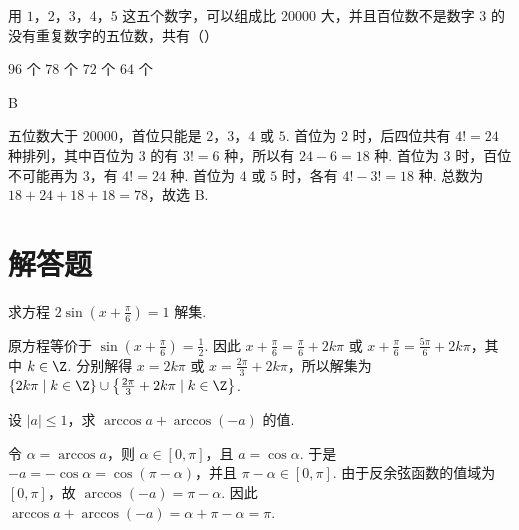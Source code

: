 \documentclass[UTF8,a4paper,oneside,11pt]{ctexbook}
\begin{document}
\begin{problem}

用 \(1\)，\(2\)，\(3\)，\(4\)，\(5\) 这五个数字，可以组成比 \(20000\) 大，并且百位数不是数字 \(3\) 的没有重复数字的五位数，共有（\quad）

\choices
    {\(96\text{ 个}\)}
    {\(78\text{ 个}\)}
    {\(72\text{ 个}\)}
    {\(64\text{ 个}\)}

\begin{answer}
B
\end{answer}

\begin{solution}
五位数大于 \(20000\)，首位只能是 \(2\)，\(3\)，\(4\) 或 \(5\). 首位为 \(2\) 时，后四位共有 \(4!=24\) 种排列，其中百位为 \(3\) 的有 \(3!=6\) 种，所以有 \(24-6=18\) 种. 首位为 \(3\) 时，百位不可能再为 \(3\)，有 \(4!=24\) 种. 首位为 \(4\) 或 \(5\) 时，各有 \(4!-3!=18\) 种. 总数为 \(18+24+18+18=78\)，故选 B.
\end{solution}
\end{problem}

\section{解答题}

\begin{problem}

求方程 \(2\sin \left(x + \frac{\pi}{6}\right) = 1\) 解集.

\begin{solution}
原方程等价于 \(\sin\left(x+\frac{\pi}{6}\right)=\frac{1}{2}\). 因此 \(x+\frac{\pi}{6}=\frac{\pi}{6}+2k\pi\) 或 \(x+\frac{\pi}{6}=\frac{5\pi}{6}+2k\pi\)，其中 \(k\in\Z\). 分别解得 \(x=2k\pi\) 或 \(x=\frac{2\pi}{3}+2k\pi\)，所以解集为 \(\left\{2k\pi\mid k\in\Z\right\}\cup\left\{\frac{2\pi}{3}+2k\pi\mid k\in\Z\right\}\).
\end{solution}
\end{problem}

\begin{problem}

设 \(|a|\leqslant 1\)，求 \(\arccos a+\arccos\left(-a\right)\) 的值.

\begin{solution}
令 \(\alpha=\arccos a\)，则 \(\alpha\in[0,\pi]\)，且 \(a=\cos\alpha\). 于是 \(-a=-\cos\alpha=\cos\left(\pi-\alpha\right)\)，并且 \(\pi-\alpha\in[0,\pi]\). 由于反余弦函数的值域为 \([0,\pi]\)，故 \(\arccos(-a)=\pi-\alpha\). 因此 \(\arccos a+\arccos(-a)=\alpha+\pi-\alpha=\pi\).
\end{solution}
\end{problem}
\end{document}

